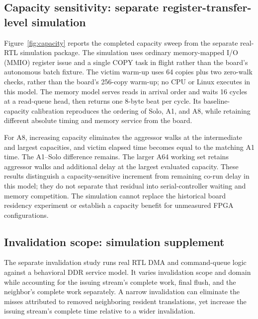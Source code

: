 \subsection{Capacity sensitivity: separate register-transfer-level simulation}
Figure~\ref{fig:capacity} reports the completed capacity sweep from the separate real-RTL simulation package. The simulation uses ordinary memory-mapped I/O (MMIO) register issue and a single COPY task in flight rather than the board's autonomous batch fixture. The victim warm-up uses 64 copies plus two zero-walk checks, rather than the board's 256-copy warm-up; no CPU or Linux executes in this model. The memory model serves reads in arrival order and waits 16 cycles at a read-queue head, then returns one 8-byte beat per cycle. Its baseline-capacity calibration reproduces the ordering of Solo, A1, and A8, while retaining different absolute timing and memory service from the board.

For A8, increasing capacity eliminates the aggressor walks at the intermediate and largest capacities, and victim elapsed time becomes equal to the matching A1 time. The A1--Solo difference remains. The larger A64 working set retains aggressor walks and additional delay at the largest evaluated capacity. These results distinguish a capacity-sensitive increment from remaining co-run delay in this model; they do not separate that residual into serial-controller waiting and memory competition. The simulation cannot replace the historical board residency experiment or establish a capacity benefit for unmeasured FPGA configurations.

\subsection{Invalidation scope: simulation supplement}
The separate invalidation study runs real RTL DMA and command-queue logic against a behavioral DDR service model. It varies invalidation scope and domain while accounting for the issuing stream's complete work, final flush, and the neighbor's complete work separately. A narrow invalidation can eliminate the misses attributed to removed neighboring resident translations, yet increase the issuing stream's complete time relative to a wider invalidation.

